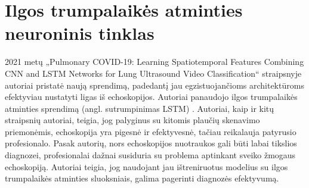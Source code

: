 \documentclass[fleqn]{VUMIFKompMagistrinis}
\begin{document}
\section{Ilgos trumpalaikės atminties neuroninis tinklas}
2021 metų „Pulmonary COVID-19: Learning Spatiotemporal Features Combining CNN and LSTM Networks for Lung Ultrasound Video Classification“ straipsnyje autoriai pristatė naują sprendimą, padedantį jau egzistuojančioms architektūroms efektyviau nustatyti ligas iš echoskopijos. Autoriai panaudojo ilgos trumpalaikės atminties sprendimą (angl. sutrumpinimas LSTM) \cite{LSTM}. Autoriai, kaip ir kitų straipsnių autoriai, teigia, jog palyginus su kitomis plaučių skenavimo priemonėmis, echoskopija yra pigesnė ir efektyvesnė, tačiau reikalauja patyrusio profesionalo. Pasak autorių, nors echoskopijos nuotraukos gali būti labai tikslios diagnozei, profesionalai dažnai susiduria su problema aptinkant sveiko žmogaus echoskopiją. Autoriai teigia, jog naudojant jau ištreniruotus modelius su ilgos trumpalaikės atminties sluoksniais, galima pagerinti diagnozės efektyvumą. \cite{LSTM}
\end{document}
